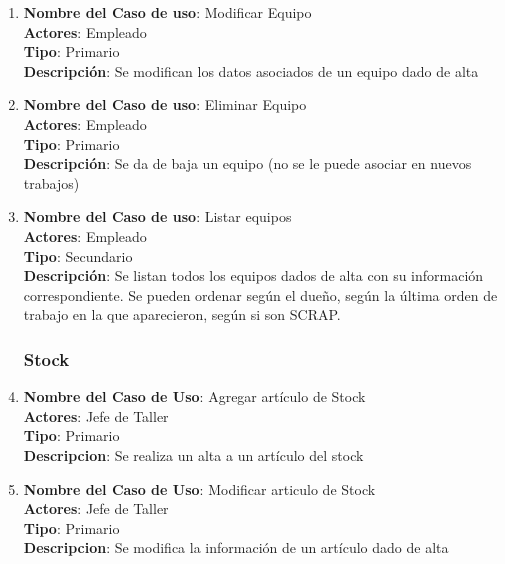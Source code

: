 \documentclass[12pt]{extarticle}
\begin{document}
\begin{spacing}{1.2}
\begin{enumerate}
        \item 	\textbf{Nombre del Caso de uso}: Modificar Equipo\\
                \textbf{Actores}: Empleado\\
                \textbf{Tipo}: Primario\\
                \textbf{Descripción}: Se modifican los datos asociados de un equipo dado de alta
        
        \item 	\textbf{Nombre del Caso de uso}: Eliminar Equipo\\
                \textbf{Actores}: Empleado\\
                \textbf{Tipo}: Primario\\
                \textbf{Descripción}: Se da de baja un equipo (no se le puede asociar en nuevos trabajos)
        
        \item 	\textbf{Nombre del Caso de uso}: Listar equipos\\
                \textbf{Actores}: Empleado\\
                \textbf{Tipo}: Secundario\\
                \textbf{Descripción}: Se listan todos los equipos dados de alta con su información correspondiente. Se pueden ordenar según el dueño, según la última orden de trabajo en la que aparecieron, según si son SCRAP.



        \subsubsection{Stock}



        \item 	\textbf{Nombre del Caso de Uso}: Agregar artículo de Stock\\
                \textbf{Actores}: Jefe de Taller\\
                \textbf{Tipo}: Primario\\
                \textbf{Descripcion}: Se realiza un alta a un artículo del stock

        \item 	\textbf{Nombre del Caso de Uso}: Modificar articulo de Stock\\
                \textbf{Actores}: Jefe de Taller\\
                \textbf{Tipo}: Primario\\
                \textbf{Descripcion}: Se modifica la información de un artículo dado de alta


\end{enumerate}
\end{spacing}
\end{document}

